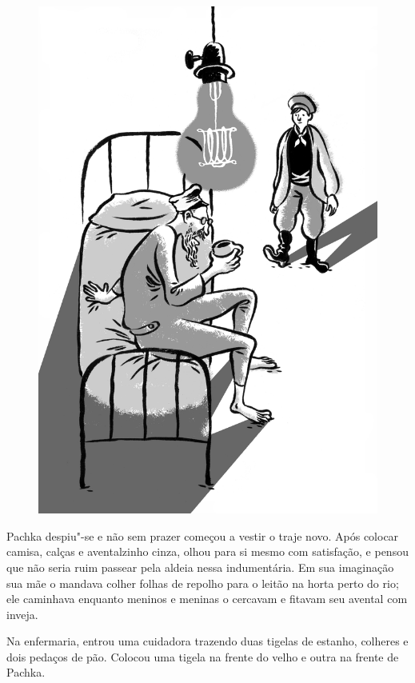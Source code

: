 \begin{figure}%
\vspace*{-2.2cm}
\hspace*{-2.5cm}\includegraphics{./imgs/cena7.jpg}
\end{figure}

Pachka despiu"-se e não sem prazer começou a vestir o traje novo. Após
colocar camisa, calças e aventalzinho cinza, olhou para si mesmo com
satisfação, e pensou que não seria ruim passear pela aldeia nessa
indumentária. Em sua imaginação sua mãe o mandava colher folhas de
repolho para o leitão na horta perto do rio; ele caminhava enquanto
meninos e meninas o cercavam e fitavam seu avental com inveja.

Na enfermaria, entrou uma cuidadora trazendo duas tigelas de estanho,
colheres e dois pedaços de pão. Colocou uma tigela na frente do velho e
outra na frente de Pachka.

